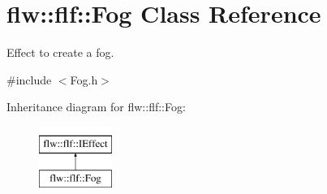 \hypertarget{classflw_1_1flf_1_1Fog}{}\section{flw\+:\+:flf\+:\+:Fog Class Reference}
\label{classflw_1_1flf_1_1Fog}


Effect to create a fog.  




{\ttfamily \#include $<$Fog.\+h$>$}

Inheritance diagram for flw\+:\+:flf\+:\+:Fog\+:\begin{figure}[H]
\begin{center}
\leavevmode
\includegraphics[height=2.000000cm]{classflw_1_1flf_1_1Fog}
\end{center}
\end{figure}
